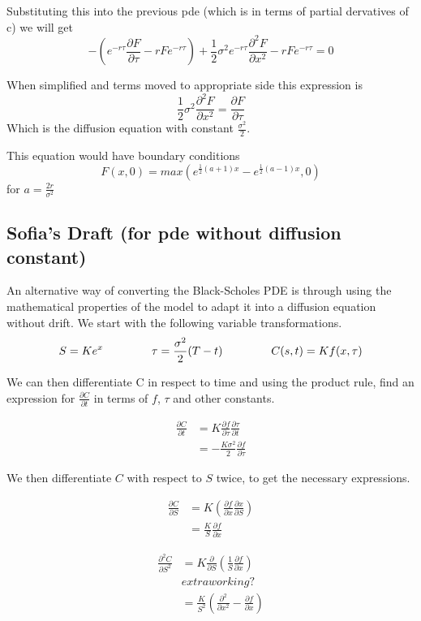 \documentclass[11pt]{article}
\begin{document}
Substituting this into the previous pde (which is in terms of partial dervatives of c) we will get 
\[
-\left( e^{-r \tau}\frac{\partial F}{\partial \tau} - r F e^{-r \tau} \right) + \frac{1}{2}\sigma^2 e^{-r \tau} \frac{\partial^2 F}{\partial x^2} - r F e^{-r \tau} = 0
\]

When simplified and terms moved to appropriate side this expression is 
\[
\frac{1}{2} \sigma^2 \frac{\partial^2 F}{\partial x^2} = \frac{\partial F}{\partial \tau}
\] 
Which is the diffusion equation with constant $\frac{\sigma^2}{2}$. 

This equation would have boundary conditions \[
F(x,0) = max(e^{\frac{1}{2}(a+1)x }- e^{\frac{1}{2}(a-1)x} , 0)
    \] for $a = \frac{2r}{\sigma^2}$



\subsection{Sofia's Draft (for pde without diffusion constant)}

An alternative way of converting the Black-Scholes PDE is through using the mathematical properties of the model to adapt it into a diffusion equation without drift. We start with the following variable transformations.
\[ S = Ke^x \hspace{1.5cm} \tau = \frac{\sigma^2}{2}(T-t) \hspace{1.5cm} C(s,t) = K f(x,\tau)\]

We can then differentiate C in respect to time and using the product rule, find an expression for $\frac{\partial C}{\partial t}$ in terms of $f$, $\tau$ and other constants.

\begin{align*}
    \frac{\partial C}{\partial t} &= K\frac{\partial f}{\partial \tau} \frac{\partial \tau}{\partial t} \\
     &= -\frac{K \sigma^2}{2} \frac{\partial f}{\partial \tau}
\end{align*}

We then differentiate $C$ with respect to $S$ twice, to get the necessary expressions.


\begin{align*}
    \frac{\partial C}{\partial S} & = K \left( \frac{\partial f}{\partial x} \frac{\partial x}{\partial S} \right) \\
    &= \frac{K}{S} \frac{\partial f}{\partial x} 
\end{align*}

\begin{align*}
    \frac{\partial^2 C}{\partial S^2} &= K \frac{\partial}{\partial S} \left( \frac{1}{S} \frac{\partial f}{\partial x} \right) \\
    & extra working? \\
    &= \frac{K}{S^2} \left( \frac{\partial^2}{\partial x^2} - \frac{\partial f}{\partial x} \right)
\end{align*}
\end{document}
